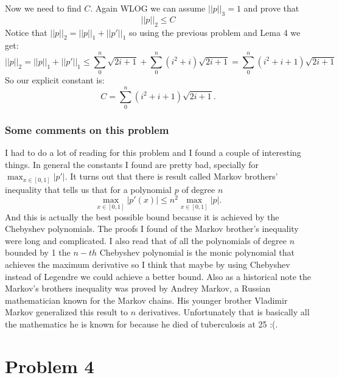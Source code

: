 \documentclass{article}
\begin{document}
Now we need to find $C$. Again WLOG we can assume $||p||_3=1$ and prove that
\[
	||p||_2\leq C
\]
Notice that $||p||_2=||p||_1+ ||p'||_1$ so using the previous problem and Lema 4 we get:
\[
	||p||_2=||p||_1+||p'||_1 \leq \sum_0^n \sqrt{2i+1} + \sum_0^n (i^2+i)\sqrt{2i+1} = \sum_0^n (i^2+i+1)\sqrt{2i+1}
\]
So our explicit constant is:
\[
	C=\sum_0^n (i^2+i+1)\sqrt{2i+1}.
\]
\subsubsection*{Some comments on this problem}
I had to do a lot of reading for this problem and I found a
couple of interesting things. In general the constants I found are pretty bad,
specially for $\max_{x\in[0,1]}|p'|$. It turns out that there is result called
Markov brothers' inequality that tells us that for a polynomial $p$ of degree
$n$
\[
\max_{x\in[0,1]}|p'(x)|\leq n^2 \max_{x\in[0,1]}|p|.
\]
And this is actually the best possible bound because it is achieved by the
Chebyshev polynomials. The proofs I found of the Markov brother's inequality
were long and complicated. I also read that of all the polynomials of degree
$n$ bounded by 1 the $n-th$ Chebyshev polynomial is the monic polynomial that
achieves the maximum derivative so I think that maybe by using Chebyshev
instead of Legendre we could achieve a better bound. Also as a historical note
the Markov's brothers inequality was proved by Andrey Markov, a Russian
mathematician known for the Markov chains. His younger brother Vladimir Markov
generalized this result to $n$ derivatives. Unfortunately that is basically all
the mathematics he is known for because he died of tuberculosis at 25 :(.
\section*{Problem 4}
\end{document}
